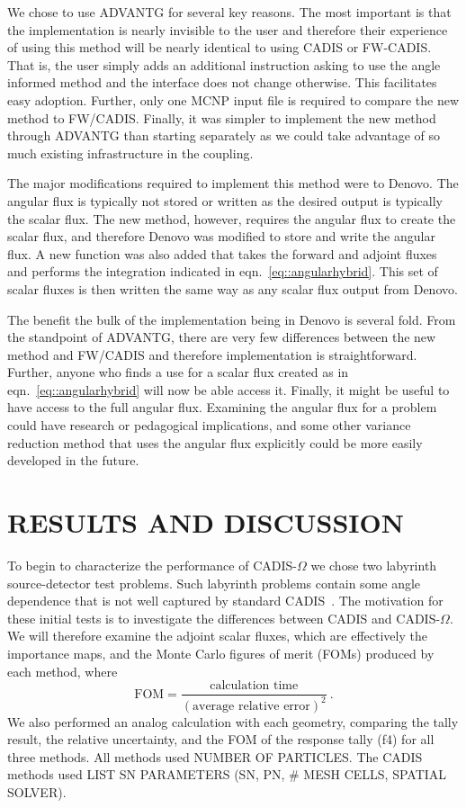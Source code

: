 \documentclass[12pt]{article}
\begin{document}
We chose to use ADVANTG for several key reasons. 
The most important is that the implementation is nearly invisible to the user and therefore their experience of using this method will be nearly identical to using CADIS or FW-CADIS.
That is, the user simply adds an additional instruction asking to use the angle informed method and the interface does not change otherwise.
This facilitates easy adoption.
Further, only one MCNP input file is required to compare the new method to FW/CADIS.
Finally, it was simpler to implement the new method through ADVANTG than starting separately as we could take advantage of so much existing infrastructure in the coupling.

The major modifications required to implement this method were to Denovo. 
The angular flux is typically not stored or written as the desired output is typically the scalar flux.
The new method, however, requires the angular flux to create the scalar flux, and therefore Denovo was modified to store and write the angular flux.
A new function was also added that takes the forward and adjoint fluxes and performs the integration indicated in eqn.~\eqref{eq::angularhybrid}. 
This set of scalar fluxes is then written the same way as any scalar flux output from Denovo.

The benefit the bulk of the implementation being in Denovo is several fold. 
From the standpoint of ADVANTG, there are very few differences between the new method and FW/CADIS and therefore implementation is straightforward.
Further, anyone who finds a use for a scalar flux created as in eqn.~\eqref{eq::angularhybrid} will now be able  access it.
Finally, it might be useful to have access to the full angular flux. 
Examining the angular flux for a problem could have research or pedagogical implications, and some other variance reduction method that uses the angular flux explicitly could be more easily developed in the future.

%
\section{RESULTS AND DISCUSSION} 
\label{sect::results}

To begin to characterize the performance of CADIS-$\Omega$ we chose two labyrinth source-detector test problems.
Such labyrinth problems contain some angle dependence that is not well captured by standard CADIS~\cite{Peplow-ORNL}. 
The motivation for these initial tests is to investigate the differences between CADIS and CADIS-$\Omega$.
We will therefore examine the adjoint scalar fluxes, which are effectively the importance maps, and the Monte Carlo figures of merit (FOMs) produced by each method, where 
\[\text{FOM} = \frac{\text{calculation time}}{(\text{average relative error})^2}\:. \]
We also performed an analog calculation with each geometry, comparing  the tally result, the relative uncertainty, and the FOM of the response tally (f4) for all three methods.
All methods used NUMBER OF PARTICLES. 
The CADIS methods used LIST SN PARAMETERS (SN, PN, \# MESH CELLS, SPATIAL SOLVER).
\end{document}
